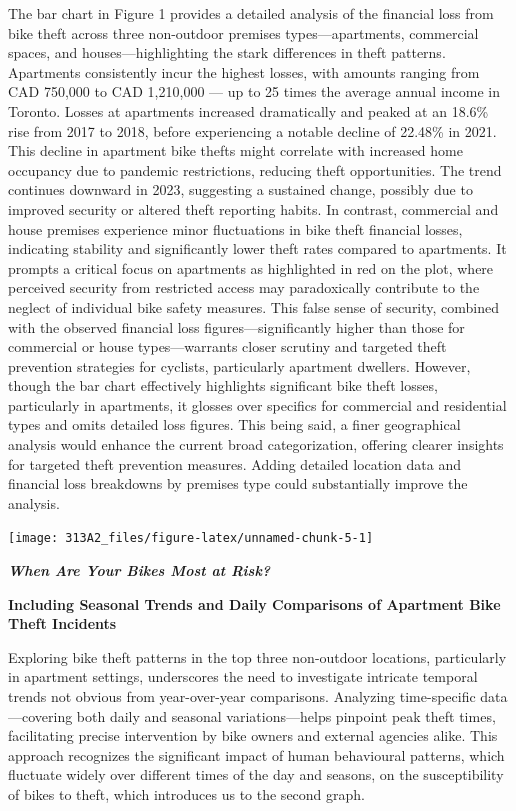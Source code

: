 \documentclass[
  11pt,
]{article}
\begin{document}
\indent The bar chart in Figure 1 provides a detailed analysis of the
financial loss from bike theft across three non-outdoor premises
types---apartments, commercial spaces, and houses---highlighting the
stark differences in theft patterns. Apartments consistently incur the
highest losses, with amounts ranging from CAD 750,000 to CAD 1,210,000
--- up to 25 times the average annual income in Toronto. Losses at
apartments increased dramatically and peaked at an 18.6\% rise from 2017
to 2018, before experiencing a notable decline of 22.48\% in 2021. This
decline in apartment bike thefts might correlate with increased home
occupancy due to pandemic restrictions, reducing theft opportunities.
The trend continues downward in 2023, suggesting a sustained change,
possibly due to improved security or altered theft reporting habits. In
contrast, commercial and house premises experience minor fluctuations in
bike theft financial losses, indicating stability and significantly
lower theft rates compared to apartments. It prompts a critical focus on
apartments as highlighted in red on the plot, where perceived security
from restricted access may paradoxically contribute to the neglect of
individual bike safety measures. This false sense of security, combined
with the observed financial loss figures---significantly higher than
those for commercial or house types---warrants closer scrutiny and
targeted theft prevention strategies for cyclists, particularly
apartment dwellers. However, though the bar chart effectively highlights
significant bike theft losses, particularly in apartments, it glosses
over specifics for commercial and residential types and omits detailed
loss figures. This being said, a finer geographical analysis would
enhance the current broad categorization, offering clearer insights for
targeted theft prevention measures. Adding detailed location data and
financial loss breakdowns by premises type could substantially improve
the analysis.

\begin{center}\texttt{[image: 313A2\_files/figure-latex/unnamed-chunk-5-1]} \end{center}

\newpage

\textit{\textbf{{When Are Your Bikes Most at Risk?}}}

\textbf{\footnotesize{Including Seasonal Trends and Daily Comparisons of Apartment Bike Theft Incidents}}

\indent Exploring bike theft patterns in the top three non-outdoor
locations, particularly in apartment settings, underscores the need to
investigate intricate temporal trends not obvious from year-over-year
comparisons. Analyzing time-specific data---covering both daily and
seasonal variations---helps pinpoint peak theft times, facilitating
precise intervention by bike owners and external agencies alike. This
approach recognizes the significant impact of human behavioural
patterns, which fluctuate widely over different times of the day and
seasons, on the susceptibility of bikes to theft, which introduces us to
the second graph.
\end{document}

